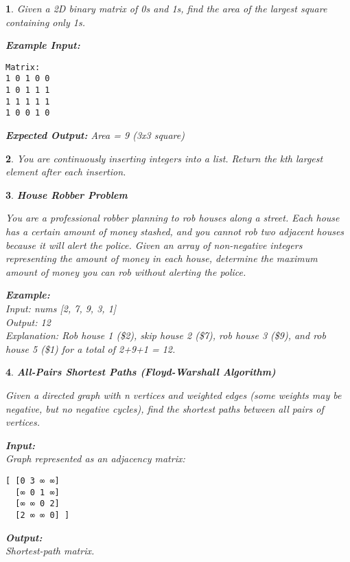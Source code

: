 \documentclass[%
addpoints]{exam}
\theoremstyle{problem}
\newtheorem{p}{}
\begin{document}
\begin{p}

Given a 2D binary matrix of 0s and 1s, find the area of the largest square containing only 1s.

\textbf{Example Input:} 
\begin{verbatim}
Matrix:
1 0 1 0 0
1 0 1 1 1
1 1 1 1 1
1 0 0 1 0
\end{verbatim}

\textbf{Expected Output:} Area = 9 (3x3 square)
\hfill \end{p}

\begin{p}

You are continuously inserting integers into a list. Return the kth largest element after each insertion.
\hfill \end{p}


\begin{p}
\textbf{House Robber Problem}

You are a professional robber planning to rob houses along a street. Each house has a certain amount of money stashed, and you cannot rob two adjacent houses because it will alert the police. Given an array of non-negative integers representing the amount of money in each house, determine the maximum amount of money you can rob without alerting the police.

\textbf{Example:}\\
Input: nums [2, 7, 9, 3, 1]\\
Output: 12\\
Explanation: Rob house 1 (\$2), skip house 2 (\$7), rob house 3 (\$9), and rob house 5 (\$1) for a total of 2+9+1 = 12.
\hfill \end{p}

\begin{p}
\textbf{All-Pairs Shortest Paths (Floyd-Warshall Algorithm)}

Given a directed graph with n vertices and weighted edges (some weights may be negative, but no negative cycles), find the shortest paths between all pairs of vertices.

\textbf{Input:}\\
Graph represented as an adjacency matrix:
\begin{verbatim}
[ [0 3 ∞ ∞]
  [∞ 0 1 ∞]
  [∞ ∞ 0 2]
  [2 ∞ ∞ 0] ]
\end{verbatim}

\textbf{Output:}\\
Shortest-path matrix.
\hfill \end{p}
\end{document}
